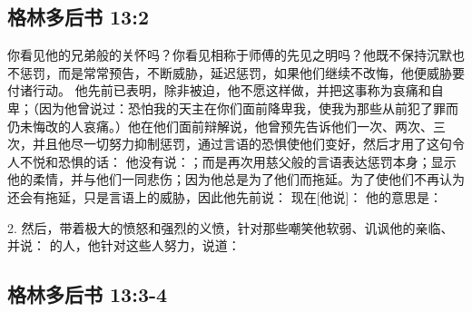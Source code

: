
\subsection{格林多后书 13:2}

\par

 你看见他的兄弟般的关怀吗？你看见相称于师傅的先见之明吗？他既不保持沉默也不惩罚，而是常常预告，不断威胁，延迟惩罚，如果他们继续不改悔，他便威胁要付诸行动。  他先前已表明，除非被迫，他不愿这样做，并把这事称为哀痛和自卑；（因为他曾说过：恐怕我的天主在你们面前降卑我，使我为那些从前犯了罪而仍未悔改的人哀痛。）他在他们面前辩解说，他曾预先告诉他们一次、两次、三次，并且他尽一切努力抑制惩罚，通过言语的恐惧使他们变好，然后才用了这句令人不悦和恐惧的话： 他没有说：；而是再次用慈父般的言语表达惩罚本身；显示他的柔情，并与他们一同悲伤；因为他总是为了他们而拖延。为了使他们不再认为还会有拖延，只是言语上的威胁，因此他先前说： 现在[他说]： 他的意思是：\par

2. 然后，带着极大的愤怒和强烈的义愤，针对那些嘲笑他软弱、讥讽他的亲临、并说：  的人，他针对这些人努力，说道：\par


\subsection{格林多后书 13:3-4}

\par


